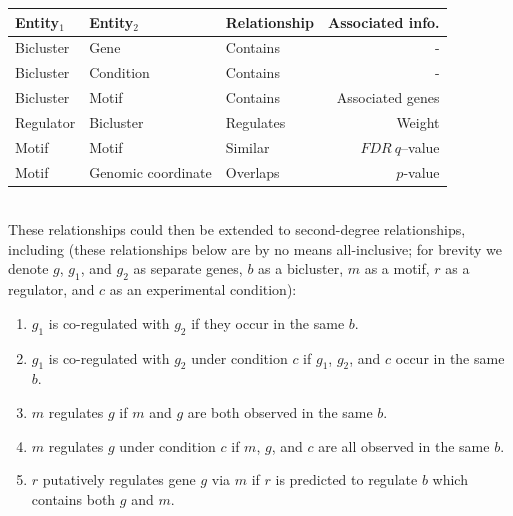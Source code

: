 \begin{tabular}{|l|l|l|r|} 
\hline
Entity$_1$        & Entity$_2$         & Relationship  & Associated info. \\ \hline
Bicluster         & Gene               & Contains      & - \\
Bicluster         & Condition          & Contains      & - \\
Bicluster         & Motif              & Contains      & Associated genes \\
Regulator         & Bicluster          & Regulates     & Weight \\
Motif             & Motif              & Similar       & $FDR\ q$--value \\
Motif             & Genomic coordinate & Overlaps      & $p$-value \\
\hline
\end{tabular}
\\

\noindent These relationships could then be extended to second-degree
relationships, including (these relationships below are by no means
all-inclusive; for brevity we denote $g$, $g_1$, and $g_2$ as separate
genes, $b$ as a bicluster, $m$ as a motif, $r$ as a regulator, and $c$
as an experimental condition):

\begin{enumerate}
\item $g_1$ is co-regulated with $g_2$ if they occur in the same $b$.
\item $g_1$ is co-regulated with $g_2$ under condition $c$ if $g_1$, $g_2$, and $c$ occur in the same $b$.
\item $m$ regulates $g$ if $m$ and $g$ are both observed in the same $b$.
\item $m$ regulates $g$ under condition $c$ if $m$, $g$, and $c$ are all observed in the same $b$.
\item $r$ putatively regulates gene $g$ via $m$ if $r$ is predicted to regulate $b$ which contains both $g$ and $m$.
\end{enumerate}



